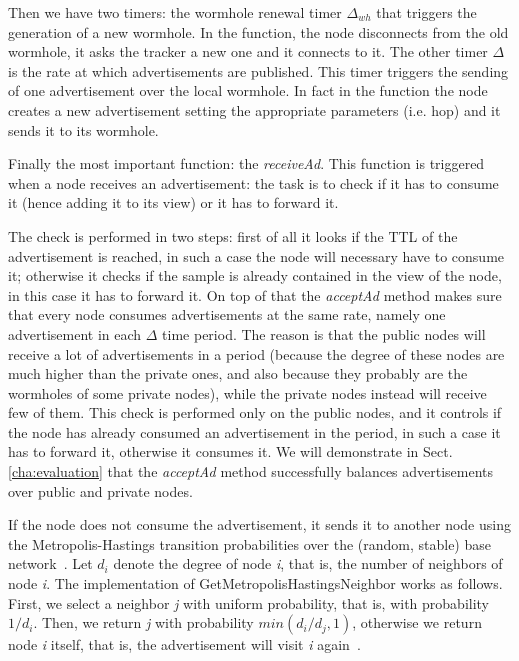 Then we have two timers: the wormhole renewal timer $\Delta_{wh}$ that triggers the generation of a new wormhole. In the function, the node disconnects from the old wormhole, it asks the tracker a new one and it connects to it. The other timer $\Delta$ is the rate at which advertisements are published. This timer triggers the sending of one advertisement over the local wormhole. In fact in the function the node creates a new advertisement setting the appropriate parameters (i.e. hop) and it sends it to its wormhole.

Finally the most important function: the \textit{receiveAd}. This function is triggered when a node receives an advertisement: the task is to check if it has to consume it (hence adding it to its view) or it has to forward it. 

The check is performed in two steps: first of all it looks if the TTL of the advertisement is reached, in such a case the node will necessary have to consume it; otherwise it checks if the sample is already contained in the view of the node, in this case it has to forward it. On top of that the \textit{acceptAd} method makes sure that every node consumes advertisements at the same rate, namely one advertisement in each $\Delta$ time period. The reason is that the public nodes will receive a lot of advertisements in a period (because the degree of these nodes are much higher than the private ones, and also because they probably are the wormholes of some private nodes), while the private nodes instead will receive few of them. This check is performed only on the public nodes, and it controls if the node has already consumed an advertisement in the period, in such a case it has to forward it, otherwise it consumes it. We will demonstrate in Sect. \ref{cha:evaluation} that the \textit{acceptAd} method successfully balances advertisements over public and private nodes.

If the node does not consume the advertisement, it sends it to another node using the Metropolis-Hastings transition probabilities over the (random, stable) base network~\cite{metropolis}.  Let $d_i$ denote the degree of node \textit{i}, that is, the number of neighbors of node \textit{i}. The implementation of GetMetropolisHastingsNeighbor works as follows. First, we select a neighbor \textit{j} with uniform probability, that is, with probability $1/d_i$. Then, we return \textit{j} with probability $min(d_i /d_j , 1)$, otherwise we return node \textit{i} itself, that is, the advertisement will visit \textit{i} again~\cite{wormhole}.
